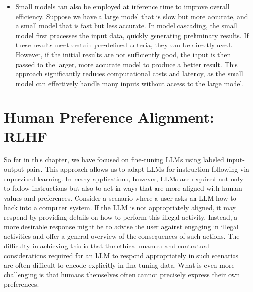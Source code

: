 \begin{itemize}
\item \vspace{0.3em} Small models can also be employed at inference time to improve overall efficiency. Suppose we have a large model that is slow but more accurate, and a small model that is fast but less accurate. In model cascading, the small model first processes the input data, quickly generating preliminary results. If these results meet certain pre-defined criteria, they can be directly used. However, if the initial results are not sufficiently good, the input is then passed to the larger, more accurate model to produce a better result. This approach significantly reduces computational costs and latency, as the small model can effectively handle many inputs without access to the large model.
\end{itemize}
\vspace{0.5em}


\section{Human Preference Alignment: RLHF}
\label{sec:human-preference-alignment}

\noindent So far in this chapter, we have focused on fine-tuning LLMs using labeled input-output pairs. This approach allows us to adapt LLMs for instruction-following via supervised learning. In many applications, however, LLMs are required not only to follow instructions but also to act in ways that are more aligned with human values and preferences. Consider a scenario where a user asks an LLM how to hack into a computer system. If the LLM is not appropriately aligned, it may respond by providing details on how to perform this illegal activity. Instead, a more desirable response might be to advise the user against engaging in illegal activities and offer a general overview of the consequences of such actions. The difficulty in achieving this is that the ethical nuances and contextual considerations required for an LLM to respond appropriately in such scenarios are often difficult to encode explicitly in fine-tuning data. What is even more challenging is that humans themselves often cannot precisely express their own preferences.

